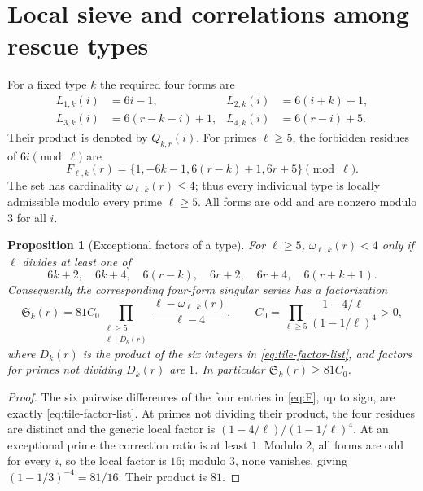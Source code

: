 \documentclass[11pt,a4paper]{article}
\newtheorem{proposition}[theorem]{Proposition}
\theoremstyle{definition}
\theoremstyle{remark}
\newcommand{\sg}{\mathfrak S}
\begin{document}
\section{Local sieve and correlations among rescue types}
For a fixed type $k$ the required four forms are
\begin{equation}\label{eq:Lk}
 \begin{aligned}
 L_{1,k}(i)&=6i-1,&L_{2,k}(i)&=6(i+k)+1,\\
 L_{3,k}(i)&=6(r-k-i)+1,&L_{4,k}(i)&=6(r-i)+5.
 \end{aligned}
\end{equation}
Their product is denoted by $Q_{k,r}(i)$.  For primes $\ell\ge5$, the forbidden residues of $6i\pmod\ell$ are
\begin{equation}\label{eq:F}
 F_{\ell,k}(r)=\{1,-6k-1,6(r-k)+1,6r+5\}\pmod\ell.
\end{equation}
The set has cardinality $\omega_{\ell,k}(r)\le4$; thus every individual type is locally admissible modulo every prime $\ell\ge5$. All forms are odd and are nonzero modulo $3$ for all $i$.

\begin{proposition}[Exceptional factors of a type]\label{prop:factor}
For $\ell\ge5$, $\omega_{\ell,k}(r)<4$ only if $\ell$ divides at least one of
\begin{equation}\label{eq:tile-factor-list}
 6k+2,\quad6k+4,\quad6(r-k),\quad6r+2,\quad6r+4,\quad6(r+k+1).
\end{equation}
Consequently the corresponding four-form singular series has a factorization
\begin{equation}\label{eq:Sk}
 \sg_k(r)=81C_0\!
 \prod_{\substack{\ell\ge5\\\ell\mid D_k(r)}}
 \frac{\ell-\omega_{\ell,k}(r)}{\ell-4},\qquad
 C_0=\prod_{\ell\ge5}\frac{1-4/\ell}{(1-1/\ell)^4}>0,
\end{equation}
where $D_k(r)$ is the product of the six integers in \eqref{eq:tile-factor-list}, and factors for primes not dividing $D_k(r)$ are $1$. In particular $\sg_k(r)\ge81C_0$.
\end{proposition}
\begin{proof}
The six pairwise differences of the four entries in \eqref{eq:F}, up to sign, are exactly \eqref{eq:tile-factor-list}.  At primes not dividing their product, the four residues are distinct and the generic local factor is $(1-4/\ell)/(1-1/\ell)^4$.  At an exceptional prime the correction ratio is at least $1$. Modulo 2, all forms are odd for every $i$, so the local factor is $16$; modulo 3, none vanishes, giving $(1-1/3)^{-4}=81/16$. Their product is $81$.
\end{proof}
\end{document}
